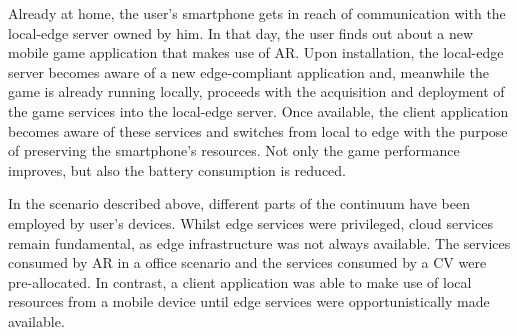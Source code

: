 Already at home, the user's smartphone gets in reach of communication with the local-edge server owned by him. In that day, the user finds out about a new mobile game application that makes use of AR. Upon installation, the local-edge server becomes aware of a new edge-compliant application and, meanwhile the game is already running locally, proceeds with the acquisition and deployment of the game services into the local-edge server. Once available, the client application becomes aware of these services and switches from local to edge with the purpose of preserving the smartphone's resources. Not only the game performance improves, but also the battery consumption is reduced.  

In the scenario described above, different parts of the continuum have been employed by user's devices. Whilst edge services were privileged, cloud services remain fundamental, as edge infrastructure was not always available. The services consumed by AR in a office scenario and the services consumed by a CV were pre-allocated. In contrast, a client application was able to make use of local resources from a mobile device until edge services were opportunistically made available. 

